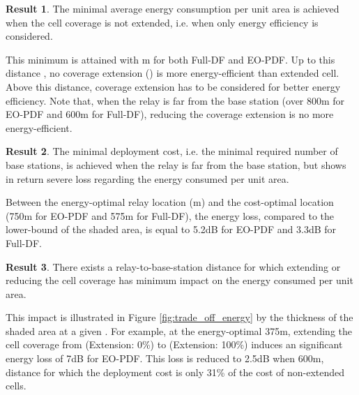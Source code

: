 \documentclass[journal]{IEEEtran}
\theoremstyle{definition}
\newtheorem{result}{Result}
\begin{document}
\vspace*{-5pt}\begin{result}
The minimal average energy consumption per unit area is achieved when the cell coverage is not extended, i.e. when only energy efficiency is considered.
\end{result} \vspace*{-5pt} \noindent
This minimum is attained with m for both Full-DF and EO-PDF. Up to this distance , no coverage extension () is more energy-efficient than extended cell. Above this distance, coverage extension has to be considered for better energy efficiency. Note that, when the relay is far from the base station (over 800m for EO-PDF and 600m for Full-DF), reducing the coverage extension is no more energy-efficient.

\vspace*{-5pt}\begin{result}
The minimal deployment cost, i.e. the minimal required number of base stations, is achieved when the relay is far from the base station, but shows in return severe loss regarding the energy consumed per unit area.
\end{result} \vspace*{-5pt} \noindent
Between the energy-optimal relay location (m) and the cost-optimal location (750m for EO-PDF and 575m for Full-DF), the energy loss, compared to the lower-bound of the shaded area, is equal to 5.2dB for EO-PDF and 3.3dB for Full-DF.


\vspace*{-5pt}\begin{result}
There exists a relay-to-base-station distance  for which extending or reducing the cell coverage has minimum impact on the energy consumed per unit area.
\end{result} \vspace*{-5pt} \noindent
This impact is illustrated in Figure \ref{fig:trade_off_energy} by the thickness of the shaded area at a given . For example, at the energy-optimal 375m, extending the cell coverage from  (Extension: 0\%) to  (Extension: 100\%) induces an significant energy loss of 7dB for EO-PDF. This loss is reduced to 2.5dB when 600m, distance for which the deployment cost is only 31\% of the cost of non-extended cells. 
\end{document}
